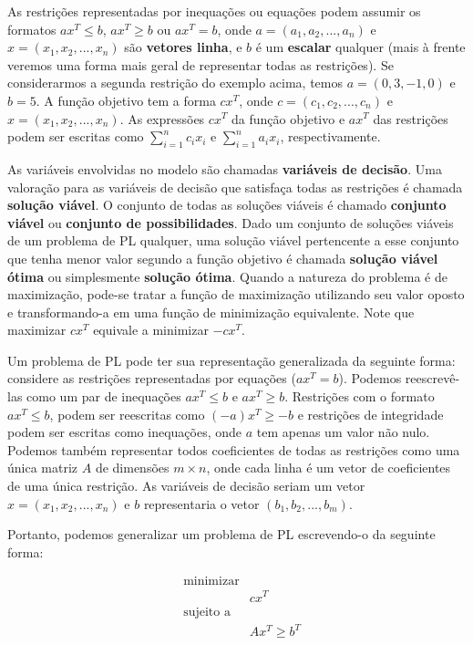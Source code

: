 As restrições representadas por inequações ou equações podem assumir os formatos $ax^T \leq b$, $ax^T \geq b$ ou $ax^T = b$, onde $a = (a_1, a_2, ..., a_n)$ e $x = (x_1, x_2, ..., x_n)$ são \textbf{vetores linha}, e $b$ é um \textbf{escalar} qualquer (mais à frente veremos uma forma mais geral de representar todas as restrições). Se considerarmos a segunda restrição do exemplo acima, temos $a = (0, 3, -1, 0)$ e $b = 5$. A função objetivo tem a forma $cx^T$, onde $c = (c_1, c_2, ..., c_n)$ e $x = (x_1, x_2, ..., x_n)$. As expressões $cx^T$ da função objetivo e $ax^T$ das restrições podem ser escritas como $\sum_{i = 1}^n c_ix_i$ e $\sum_{i = 1}^n a_ix_i$, respectivamente.

As variáveis envolvidas no modelo são chamadas \textbf{variáveis de decisão}. Uma valoração para as variáveis de decisão que satisfaça todas as restrições é chamada \textbf{solução viável}. O conjunto de todas as soluções viáveis é chamado \textbf{conjunto viável} ou \textbf{conjunto de possibilidades}. Dado um conjunto de soluções viáveis de um problema de PL qualquer, uma solução viável  pertencente a esse conjunto que tenha menor valor segundo a função objetivo é chamada \textbf{solução viável ótima} ou simplesmente \textbf{solução ótima}. Quando a natureza do problema é de maximização, pode-se tratar a função de maximização utilizando seu valor oposto e transformando-a em uma função de minimização equivalente. Note que maximizar $cx^T$ equivale a minimizar $-cx^T$.

Um problema de PL pode ter sua representação generalizada da seguinte forma: considere as restrições representadas por equações ($ax^T = b$). Podemos reescrevê-las como um par de inequações $ax^T \leq b$ e $ax^T \geq b$. Restrições com o formato $ax^T \leq b$, podem ser reescritas como $(-a)x^T \geq -b$ e restrições de integridade podem ser escritas como inequações, onde $a$ tem apenas um valor não nulo. Podemos também representar todos coeficientes de todas as restrições como uma única matriz $A$ de dimensões $m \times n$, onde cada linha é um vetor de coeficientes de uma única restrição. As variáveis de decisão seriam um vetor $x = (x_1, x_2, ..., x_n)$ e $b$ representaria o vetor $(b_1, b_2, ..., b_m)$. 

Portanto, podemos generalizar um problema de PL escrevendo-o da seguinte forma:

\begin{equation*}
\begin{aligned}
& \text{minimizar} \\
& &  cx^T \\
& \text{sujeito a} \\
& & Ax^T \geq b^T 
\end{aligned}
\end{equation*}

